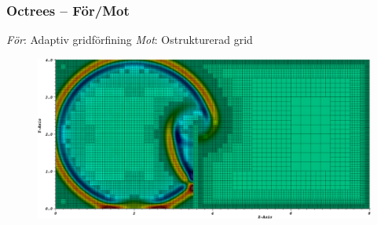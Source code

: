 \begin{frame}
\frametitle{Octrees -- För/Mot}


\begin{itemize}[<+(1)->]
\proitem \emph{För}: Adaptiv gridförfining
\conitem \emph{Mot}: Ostrukturerad grid
\end{itemize}



\begin{figure}
\centering
\includegraphics[width=\textwidth]{../Presentation/Images/Attribute/AMR/Amr}
\end{figure}

\end{frame}
